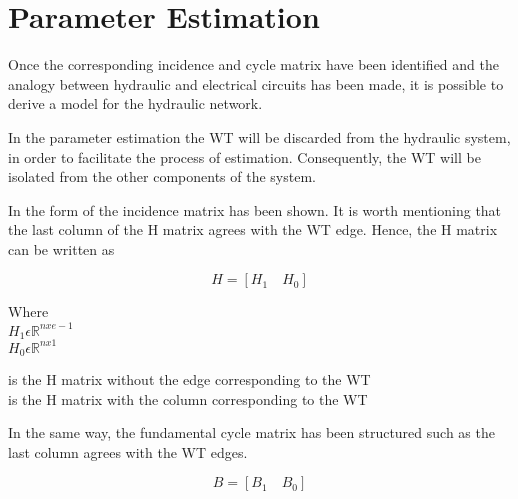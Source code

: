 \section{Parameter Estimation}  
\label{ParameterEstimation}
Once the corresponding incidence and cycle matrix have been identified and the analogy between hydraulic and
electrical circuits has been made, it is possible to derive a model for the hydraulic network. 

In the parameter estimation the WT will be discarded from the hydraulic system, 
in order to facilitate the process of estimation. Consequently, the WT will be isolated from the other components of the
system.  



In  the form of the incidence matrix has been shown. It is worth mentioning that the last column of the H matrix agrees with the WT edge. Hence, the H matrix can be written as 

\begin {equation}
H = [H_1 \quad H_0]
\end{equation}

\begin{minipage}[t]{0.20\textwidth}
Where\\
\hspace*{8mm} $H_1 \epsilon \mathbb{R}^{nxe-1}$  \\
\hspace*{8mm} $H_0 \epsilon \mathbb{R}^{nx1} $ 
\end{minipage}
\begin{minipage}[t]{0.68\textwidth}
\vspace*{2mm}
\hspace*{4mm} is the H matrix without the edge corresponding to the WT\\
\hspace*{4mm} is the H matrix with the column corresponding to the WT 
\end{minipage}

In the same way, the fundamental cycle matrix has been structured such as the last column agrees with the WT edges.

\begin{equation}
  B = [B_1 \quad B_0]
\end{equation} 


